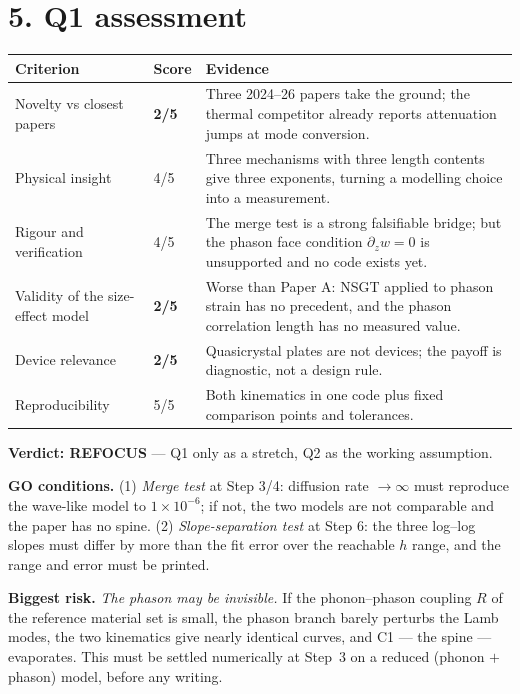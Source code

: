 \documentclass[11pt]{article}
\begin{document}
\section*{5. Q1 assessment}
\begin{table}[h]
\centering\small
\begin{tabular}{p{5.2cm}p{1.2cm}p{8.2cm}}
\hline
Criterion & Score & Evidence \\
\hline
Novelty vs closest papers & \textbf{2/5} & Three 2024--26 papers take the ground; the thermal competitor already reports attenuation jumps at mode conversion. \\
Physical insight & 4/5 & Three mechanisms with three length contents give three exponents, turning a modelling choice into a measurement. \\
Rigour and verification & 4/5 & The merge test is a strong falsifiable bridge; but the phason face condition $\partial_z w=0$ is unsupported and no code exists yet. \\
Validity of the size-effect model & \textbf{2/5} & Worse than Paper A: NSGT applied to phason strain has no precedent, and the phason correlation length has no measured value. \\
Device relevance & \textbf{2/5} & Quasicrystal plates are not devices; the payoff is diagnostic, not a design rule. \\
Reproducibility & 5/5 & Both kinematics in one code plus fixed comparison points and tolerances. \\
\hline
\end{tabular}
\end{table}

\textbf{Verdict: REFOCUS} --- Q1 only as a stretch, Q2 as the working assumption.

\textbf{GO conditions.} (1) \emph{Merge test} at Step 3/4: diffusion rate $\to\infty$ must reproduce
the wave-like model to $1\times10^{-6}$; if not, the two models are not comparable and the paper has
no spine. (2) \emph{Slope-separation test} at Step 6: the three log--log slopes must differ by more
than the fit error over the reachable $h$ range, and the range and error must be printed.

\textbf{Biggest risk.} \emph{The phason may be invisible.} If the phonon--phason coupling $R$ of the
reference material set is small, the phason branch barely perturbs the Lamb modes, the two kinematics
give nearly identical curves, and C1 --- the spine --- evaporates. This must be settled numerically
at Step~3 on a reduced (phonon $+$ phason) model, before any writing.
\end{document}
